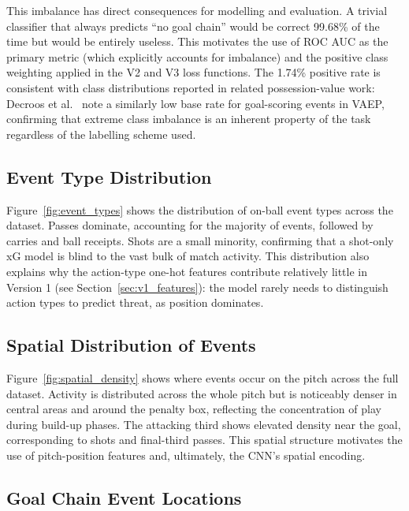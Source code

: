 This imbalance has direct consequences for modelling and evaluation. A trivial classifier that always predicts ``no goal chain'' would be correct 99.68\% of the time but would be entirely useless. This motivates the use of ROC AUC as the primary metric (which explicitly accounts for imbalance) and the positive class weighting applied in the V2 and V3 loss functions. The 1.74\% positive rate is consistent with class distributions reported in related possession-value work: Decroos et al.~\cite{decroos2019} note a similarly low base rate for goal-scoring events in VAEP, confirming that extreme class imbalance is an inherent property of the task regardless of the labelling scheme used.

\subsection{Event Type Distribution}

Figure~\ref{fig:event_types} shows the distribution of on-ball event types across the dataset. Passes dominate, accounting for the majority of events, followed by carries and ball receipts. Shots are a small minority, confirming that a shot-only xG model is blind to the vast bulk of match activity. This distribution also explains why the action-type one-hot features contribute relatively little in Version 1 (see Section~\ref{sec:v1_features}): the model rarely needs to distinguish action types to predict threat, as position dominates.


\subsection{Spatial Distribution of Events}

Figure~\ref{fig:spatial_density} shows where events occur on the pitch across the full dataset. Activity is distributed across the whole pitch but is noticeably denser in central areas and around the penalty box, reflecting the concentration of play during build-up phases. The attacking third shows elevated density near the goal, corresponding to shots and final-third passes. This spatial structure motivates the use of pitch-position features and, ultimately, the CNN's spatial encoding.


\subsection{Goal Chain Event Locations}

